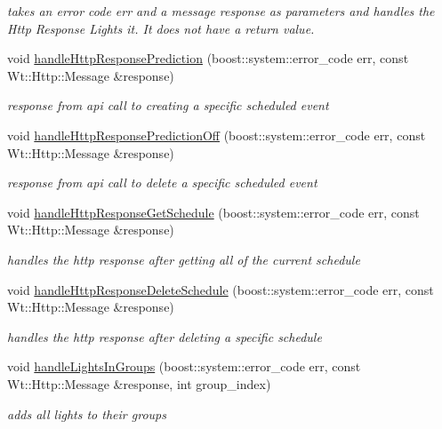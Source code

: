 \begin{DoxyCompactItemize}
\begin{DoxyCompactList}\small\item\em takes an error code err and a message response as parameters and handles the Http Response Lights it. It does not have a return value. \end{DoxyCompactList}\item 
void \hyperlink{class_home_page_a35ecb731b87a0b752be365d42dfa8bf7}{handle\+Http\+Response\+Prediction} (boost\+::system\+::error\+\_\+code err, const Wt\+::\+Http\+::\+Message \&response)
\begin{DoxyCompactList}\small\item\em response from api call to creating a specific scheduled event \end{DoxyCompactList}\item 
void \hyperlink{class_home_page_a7f37c86187bf9bee98eb5f905422eb9c}{handle\+Http\+Response\+Prediction\+Off} (boost\+::system\+::error\+\_\+code err, const Wt\+::\+Http\+::\+Message \&response)
\begin{DoxyCompactList}\small\item\em response from api call to delete a specific scheduled event \end{DoxyCompactList}\item 
void \hyperlink{class_home_page_a84f498dee2335d7f6d11e89105cb82bc}{handle\+Http\+Response\+Get\+Schedule} (boost\+::system\+::error\+\_\+code err, const Wt\+::\+Http\+::\+Message \&response)
\begin{DoxyCompactList}\small\item\em handles the http response after getting all of the current schedule \end{DoxyCompactList}\item 
void \hyperlink{class_home_page_a9fd215402b2cc96281c39454e9c70d69}{handle\+Http\+Response\+Delete\+Schedule} (boost\+::system\+::error\+\_\+code err, const Wt\+::\+Http\+::\+Message \&response)
\begin{DoxyCompactList}\small\item\em handles the http response after deleting a specific schedule \end{DoxyCompactList}\item 
void \hyperlink{class_home_page_a3ece53358d71e7a893cf4284dbcff175}{handle\+Lights\+In\+Groups} (boost\+::system\+::error\+\_\+code err, const Wt\+::\+Http\+::\+Message \&response, int group\+\_\+index)
\begin{DoxyCompactList}\small\item\em adds all lights to their groups \end{DoxyCompactList}\item 

\end{DoxyCompactItemize}
